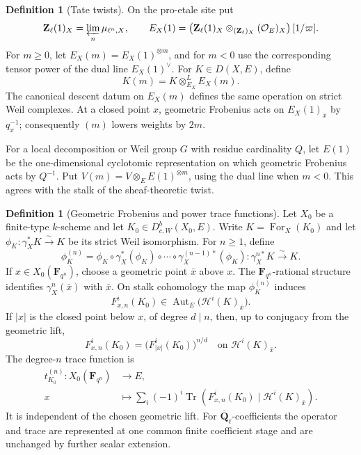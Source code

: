 \documentclass[10pt]{article}
\theoremstyle{definition}
\newtheorem{definition}[theorem]{Definition}
\newcommand{\Qlb}{\overline{\mathbf Q}_\ell}
\newcommand{\DbcW}{D^b_{c,W}}
\begin{document}
\begin{definition}[Tate twists]
On the pro-etale site put
\[
 \mathbf Z_\ell(1)_X=\varprojlim_n\mu_{\ell^n,X},
 \qquad
 E_X(1)=
 \left(\mathbf Z_\ell(1)_X
 \otimes_{(\mathbf Z_\ell)_X}(\mathcal O_E)_X\right)[1/\varpi].
\]
For \(m\ge0\), let \(E_X(m)=E_X(1)^{\otimes m}\), and for \(m<0\) use
the corresponding tensor power of the dual line \(E_X(1)^\vee\).  For
\(K\in D(X,E)\), define
\[
                         K(m)=K\otimes^L_{E_X}E_X(m).
\]
The canonical descent datum on \(E_X(m)\) defines the same operation on
strict Weil complexes.  At a closed point \(x\), geometric Frobenius acts
on \(E_X(1)_{\bar x}\) by \(q_x^{-1}\); consequently \((m)\) lowers weights
by \(2m\).

For a local decomposition or Weil group \(G\) with residue cardinality
\(Q\), let \(E(1)\) be the one-dimensional cyclotomic representation on
which geometric Frobenius acts by \(Q^{-1}\).  Put
\(V(m)=V\otimes_EE(1)^{\otimes m}\), using the dual line when \(m<0\).
This agrees with the stalk of the sheaf-theoretic twist.
\end{definition}

\begin{definition}[Geometric Frobenius and power trace functions]
Let \(X_0\) be a finite-type \(k\)-scheme and let
\(K_0\in\DbcW(X_0,E)\).  Write \(K=\operatorname{For}_X(K_0)\) and let
\(\phi_K:\gamma_X^*K\xrightarrow{\sim}K\) be its strict Weil isomorphism.
For \(n\geq1\), define
\[
 \phi_K^{(n)}=
 \phi_K\circ\gamma_X^*(\phi_K)\circ\cdots\circ
 \gamma_X^{(n-1)*}(\phi_K):\gamma_X^{n*}K\xrightarrow{\sim}K.
\]
If \(x\in X_0(\mathbf F_{q^n})\), choose a geometric point \(\bar x\)
above \(x\).  The \(\mathbf F_{q^n}\)-rational structure identifies
\(\gamma_X^n(\bar x)\) with \(\bar x\).  On stalk cohomology the map
\(\phi_K^{(n)}\) induces
\[
 F_{x,n}^i(K_0)\in
 \operatorname{Aut}_E\bigl(\mathcal H^i(K)_{\bar x}\bigr).
\]
If \(|x|\) is the closed point below \(x\), of degree \(d\mid n\), then,
up to conjugacy from the geometric lift,
\[
 F_{x,n}^i(K_0)=\bigl(F_{|x|}^i(K_0)\bigr)^{n/d}
       \quad\text{on }\mathcal H^i(K)_{\bar x}.
\]
The degree-\(n\) trace function is
\[
 \begin{aligned}
 t_{K_0}^{(n)}:X_0(\mathbf F_{q^n})&\longrightarrow E,\\
 x&\longmapsto
 \sum_i(-1)^i\operatorname{Tr}\!\left(
 F_{x,n}^i(K_0)\mid\mathcal H^i(K)_{\bar x}\right).
 \end{aligned}
\]
It is independent of the chosen geometric lift.  For \(\Qlb\)-coefficients
the operator and trace are represented at one common finite coefficient
stage and are unchanged by further scalar extension.
\end{definition}
\end{document}
